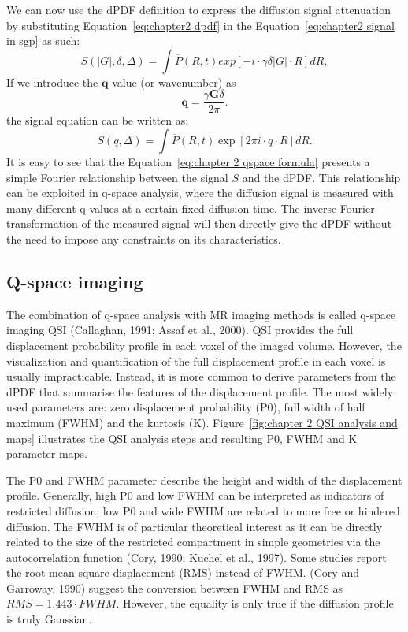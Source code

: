 We can now use the \gls{dPDF} definition to express the diffusion signal attenuation by substituting Equation~\ref{eq:chapter2 dpdf} in the Equation~\ref{eq:chapter2 signal in sgp} as such:
\begin{equation}
		S(|G|,\delta,\Delta)=\int \overline{P}(R,t) exp[-i\cdot \gamma \delta |G|\cdot R] dR,
\end{equation}
If we introduce the $\textbf{q}$-value (or wavenumber) as
 \begin{equation}
\textbf{q}=\frac{\gamma \textbf{G}\delta}{2\pi}.
\label{eq: chapter 2 q value definition}
\end{equation}
the signal equation can be written as:
\begin{equation}
		S(q,\Delta)=\int \overline{P}(R,t) \exp[2\pi i \cdot q\cdot R] dR.
\label{eq:chapter 2 qspace formula}
\end{equation}
It is easy to see that the Equation~\ref{eq:chapter 2 qspace formula} presents a simple Fourier relationship between the signal $S$ and the \gls{dPDF}. This relationship can be exploited in q-space analysis, where the diffusion signal is measured with many different q-values at a certain fixed diffusion time. The inverse Fourier transformation of the measured signal will then directly give the \gls{dPDF} without the need to impose any constraints on its characteristics.

\subsection{Q-space imaging}
\label{sec:qspace}
The combination of q-space analysis with MR imaging methods is called q-space imaging \gls{QSI} (Callaghan, 1991; Assaf et al., 2000). \gls{QSI} provides the full displacement probability profile in each voxel of the imaged volume. However, the visualization and quantification of the full displacement profile in each voxel is usually impracticable. Instead, it is more common to derive parameters from the dPDF that summarise the features of the displacement profile. The most widely used parameters are: zero displacement probability (P0), full width of half maximum (FWHM) and the kurtosis (K). Figure~\ref{fig:chapter 2 QSI analysis and maps} illustrates the QSI analysis steps and resulting P0, FWHM and K parameter maps.

The P0 and FWHM parameter describe the height and width of the displacement profile. Generally, high P0 and low FWHM can be interpreted as indicators of restricted diffusion; low P0 and wide FWHM are related to more free or hindered diffusion. The FWHM is of particular theoretical interest as it can be directly related to the size of the restricted compartment in simple geometries via the autocorrelation function (Cory, 1990; Kuchel et al., 1997). Some studies report the root mean square displacement (RMS) instead of FWHM. (Cory and Garroway, 1990) suggest the conversion between FWHM and RMS as $RMS = 1.443 \cdot FWHM$. However, the equality is only true if the diffusion profile is truly Gaussian.


